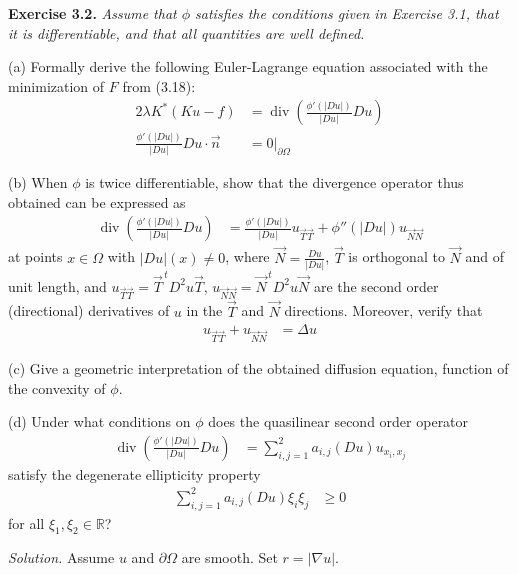 \documentclass[12pt,letterpaper]{article}
\newcommand{\exercise}[1]{%
  \par\bigskip\noindent\textbf{Exercise #1.}\enspace}
\newenvironment{statement}{\itshape\ignorespaces}{\par}
\newcommand{\solution}{\par\medskip\noindent\textit{Solution.}\enspace}
\begin{document}
\newpage
\begin{samepage}
\exercise{3.2}
\begin{statement}
Assume that $\phi$ satisfies the conditions given in Exercise 3.1,
that it is differentiable, and that all quantities are well defined.
\par\smallskip
(a) Formally derive the following Euler-Lagrange equation associated
with the minimization of $F$ from (3.18):
\begin{align*}
 2\lambda K^*(Ku-f)
 &=\operatorname{div}\!\left(\frac{\phi'(|Du|)}{|Du|}Du\right)\\
 \frac{\phi'(|Du|)}{|Du|}Du\cdot\vec n
 &=0\big|_{\partial\Omega}
\end{align*}
\par\smallskip
(b) When $\phi$ is twice differentiable, show that the divergence
operator thus obtained can be expressed as
\begin{align*}
 \operatorname{div}\!\left(\frac{\phi'(|Du|)}{|Du|}Du\right)
 &=\frac{\phi'(|Du|)}{|Du|}u_{\vec T\vec T}
   +\phi''(|Du|)u_{\vec N\vec N}
\end{align*}
at points $x\in\Omega$ with $|Du|(x)\ne0$, where
$\vec N=\frac{Du}{|Du|}$, $\vec T$ is orthogonal to $\vec N$ and
of unit length, and $u_{\vec T\vec T}=\vec T^{\,t}D^2u\vec T$,
$u_{\vec N\vec N}=\vec N^{\,t}D^2u\vec N$ are the second order
(directional) derivatives of $u$ in the $\vec T$ and $\vec N$
directions. Moreover, verify that
\begin{align*}
 u_{\vec T\vec T}+u_{\vec N\vec N}&=\Delta u
\end{align*}
\par\smallskip
(c) Give a geometric interpretation of the obtained diffusion
equation, function of the convexity of $\phi$.
\par\smallskip
(d) Under what conditions on $\phi$ does the quasilinear second order
operator
\begin{align*}
 \operatorname{div}\!\left(\frac{\phi'(|Du|)}{|Du|}Du\right)
 &=\sum_{i,j=1}^{2}a_{i,j}(Du)u_{x_i,x_j}
\end{align*}
satisfy the degenerate ellipticity property
\begin{align*}
 \sum_{i,j=1}^{2}a_{i,j}(Du)\xi_i\xi_j&\ge0
\end{align*}
for all $\xi_1,\xi_2\in\mathbb R$?
\end{statement}
\end{samepage}

\solution
Assume $u$ and $\partial\Omega$ are smooth. Set $r=|\nabla u|$.
\end{document}
